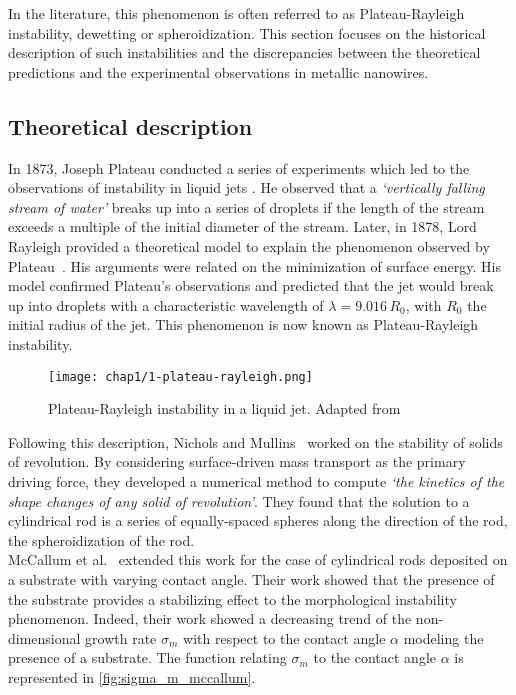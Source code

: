 In the literature, this phenomenon is often referred to as Plateau-Rayleigh instability, dewetting or spheroidization. This section focuses on the historical description of such instabilities and the discrepancies between the theoretical predictions and the experimental observations in metallic nanowires.
\subsection{Theoretical description}
        In 1873, Joseph Plateau conducted a series of experiments which led to the observations of instability in liquid jets \cite{Plateau1873}. He observed that a \textit{`vertically falling stream of water'} breaks up into a series of droplets if the length of the stream exceeds a multiple of the initial diameter of the stream. Later, in 1878, Lord Rayleigh provided a theoretical model to explain the phenomenon observed by Plateau\ \cite{Rayleigh1878}. His arguments were related on the minimization of surface energy. His model confirmed Plateau's observations and predicted that the jet would break up into droplets with a characteristic wavelength of $\lambda = 9.016\,R_0$, with $R_0$ the initial radius of the jet. This phenomenon is now known as Plateau-Rayleigh instability.
        \begin{figure}[H]
                \centering
                \texttt{[image: chap1/1-plateau-rayleigh.png]}
                \caption{Plateau-Rayleigh instability in a liquid jet. Adapted from\ \cite{RutlandJameson1971}}
                \label{fig:plateau-rayleigh}
        \end{figure}
        Following this description, Nichols and Mullins\ \cite{NicholsMullins1965} worked on the stability of solids of revolution. By considering surface-driven mass transport as the primary driving force, they developed a numerical method to compute \textit{`the kinetics of the shape changes of any solid of revolution'}. They found that the solution to a cylindrical rod is a series of equally-spaced spheres along the direction of the rod, the spheroidization of the rod.\\%
        McCallum et al.\ \cite{McCallumVoorheesMiksisDavisWong1996} extended this work for the case of cylindrical rods deposited on a substrate with varying contact angle. Their work showed that the presence of the substrate provides a stabilizing effect to the morphological instability phenomenon. Indeed, their work showed a decreasing trend of the non-dimensional growth rate $\sigma_m$ with respect to the contact angle $\alpha$ modeling the presence of a substrate. The function relating $\sigma_m$ to the contact angle $\alpha$ is represented in \autoref{fig:sigma_m_mccallum}.
